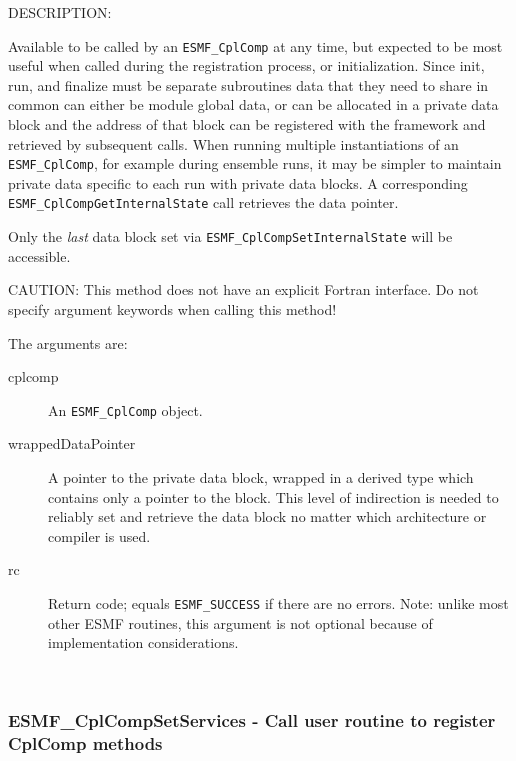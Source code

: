 {\sf DESCRIPTION:\\ }


   Available to be called by an {\tt ESMF\_CplComp} at any time, but
   expected to be
   most useful when called during the registration process, or initialization.
   Since init, run, and finalize must be separate subroutines data that
   they need to share in common can either be module global data, or can
   be allocated in a private data block and the address of that block
   can be registered with the framework and retrieved by subsequent calls.
   When running multiple instantiations of an {\tt ESMF\_CplComp},
   for example during
   ensemble runs, it may be simpler to maintain private data specific to
   each run with private data blocks.  A corresponding
   {\tt ESMF\_CplCompGetInternalState} call retrieves the data pointer.
  
   Only the {\em last} data block set via
   {\tt ESMF\_CplCompSetInternalState} will be accessible.
  
   CAUTION: This method does not have an explicit Fortran interface. Do not
   specify argument keywords when calling this method!
  
   The arguments are:
   \begin{description}
   \item[cplcomp]
     An {\tt ESMF\_CplComp} object.
   \item[wrappedDataPointer]
     A pointer to the private data block, wrapped in a derived type which
     contains only a pointer to the block.  This level of indirection is
     needed to reliably set and retrieve the data block no matter which
     architecture or compiler is used.
   \item[rc]
     Return code; equals {\tt ESMF\_SUCCESS} if there are no errors.
     Note: unlike most other ESMF routines, this argument is not optional
     because of implementation considerations.
   \end{description}
   
 
\mbox{}\hrulefill\ 
 
\subsubsection [ESMF\_CplCompSetServices] {ESMF\_CplCompSetServices - Call user routine to register CplComp methods}


